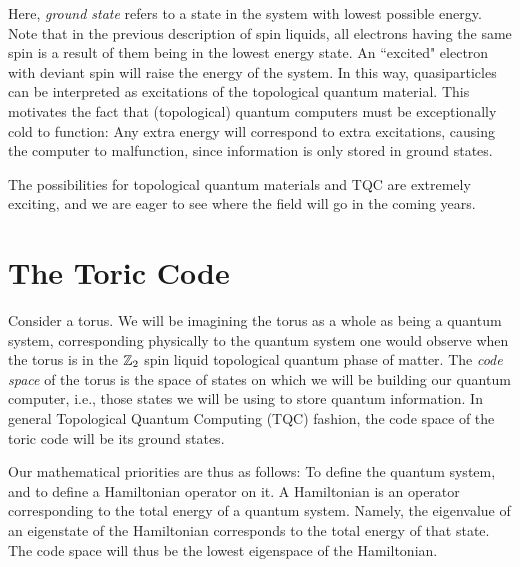 \documentclass{article}
\theoremstyle{definition}
\numberwithin{figure}{section}
\begin{document}
Here, \textit{ground state} refers to a state in the system with lowest possible energy. Note that in the previous description of spin liquids, all electrons having the same spin is a result of them being in the lowest energy state. An ``excited" electron with deviant spin will raise the energy of the system. In this way, quasiparticles can be interpreted as excitations of the topological quantum material. This motivates the fact that (topological) quantum computers must be exceptionally cold to function: Any extra energy will correspond to extra excitations, causing the computer to malfunction, since information is only stored in ground states.

The possibilities for topological quantum materials and TQC are extremely exciting, and we are eager to see where the field will go in the coming years.

\section{The Toric Code}
\label{The Toric Code}

Consider a torus. We will be imagining the torus as a whole as being a quantum system, corresponding physically to the quantum system one would observe when the torus is in the $\mathbb{Z}_2$ spin liquid topological quantum phase of matter. The \textit{code space} of the torus is the space of states on which we will be building our quantum computer, i.e., those states we will be using to store quantum information. In general Topological Quantum Computing (TQC) fashion, the code space of the toric code will be its ground states.

Our mathematical priorities are thus as follows: To define the quantum system, and to define a Hamiltonian operator on it. A Hamiltonian is an operator corresponding to the total energy of a quantum system. Namely, the eigenvalue of an eigenstate of the Hamiltonian corresponds to the total energy of that state. The code space will thus be the lowest eigenspace of the Hamiltonian.
\end{document}
